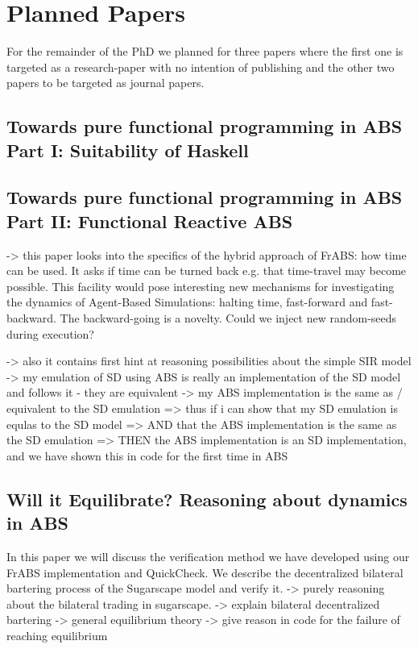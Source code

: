 \section{Planned Papers}
For the remainder of the PhD we planned for three papers where the first one is targeted as a research-paper with no intention of publishing and the other two papers to be targeted as journal papers.

\subsection{Towards pure functional programming in ABS Part I: Suitability of Haskell}

\subsection{Towards pure functional programming in ABS Part II: Functional Reactive ABS}
-> this paper looks into the specifics of the hybrid approach of FrABS: how time can be used. It asks if time can be turned back e.g. that time-travel may become possible. This facility would pose interesting new mechanisms for investigating the dynamics of Agent-Based Simulations: halting time, fast-forward and fast-backward. The backward-going is a novelty. Could we inject new random-seeds during execution? 

-> also it contains first hint at reasoning possibilities about the simple SIR model
		-> my emulation of SD using ABS is really an implementation of the SD model and follows it - they are equivalent
		-> my ABS implementation is the same as / equivalent to the SD emulation
			=> thus if i can show that my SD emulation is equlas to the SD model
			=> AND that the ABS implementation is the same as the SD emulation
			=> THEN the ABS implementation is an SD implementation, and we have shown this in code for the first time in ABS

\subsection{Will it Equilibrate? Reasoning about dynamics in ABS}
In this paper we will discuss the verification method we have developed using our FrABS implementation and QuickCheck. We describe the decentralized bilateral bartering process of the Sugarscape model and verify it.
-> purely reasoning about the bilateral trading in sugarscape.
	-> explain bilateral decentralized bartering
	-> general equilibrium theory
	-> give reason in code for the failure of reaching equilibrium


